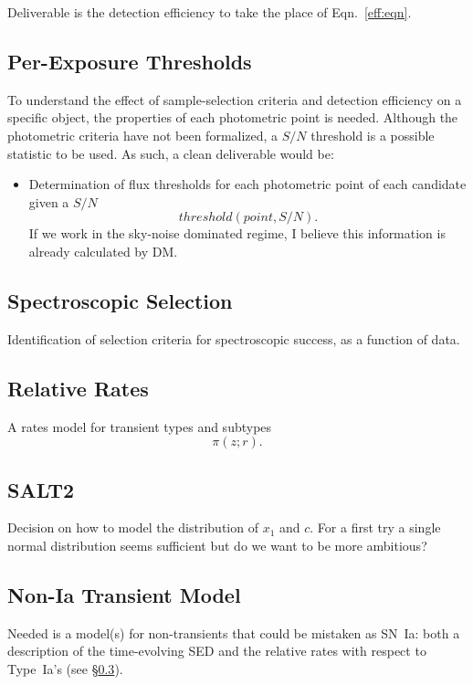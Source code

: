 \documentclass[preprint,3p]{elsarticle}
\begin{document}
Deliverable is the detection efficiency to take the place of Eqn.~\ref{eff:eqn}.

\subsection{Per-Exposure Thresholds}
To understand the effect of sample-selection criteria and detection efficiency
on a specific object, the
properties of each photometric point is needed.  Although the photometric criteria
have not been formalized, a $S/N$ threshold is a possible statistic to be used.
As such, a clean deliverable would be:
\begin{itemize}
\item Determination of flux thresholds for each photometric point of each candidate
given
a $S/N$
\begin{equation}
threshold(point, S/N).
\end{equation}
If we work in the sky-noise dominated regime, I believe this information is already
calculated by DM.
\end{itemize}

\subsection{Spectroscopic Selection}
Identification of selection criteria for spectroscopic success, as a function
of data.

\subsection{Relative Rates}
\label{rates:sec}
A rates model for transient types and subtypes
\begin{equation}
\pi(z;r).
\end{equation}
\subsection{SALT2}
Decision on how to model the distribution of $x_1$ and $c$.  For a first try a
single normal distribution seems sufficient but do we want to be more ambitious?
\subsection{Non-Ia Transient Model}
Needed is a model(s) for non-transients that could be mistaken as SN~Ia:
both a description of the time-evolving SED and the relative rates
with respect to Type~Ia's (see \S\ref{rates:sec}).
\end{document}
